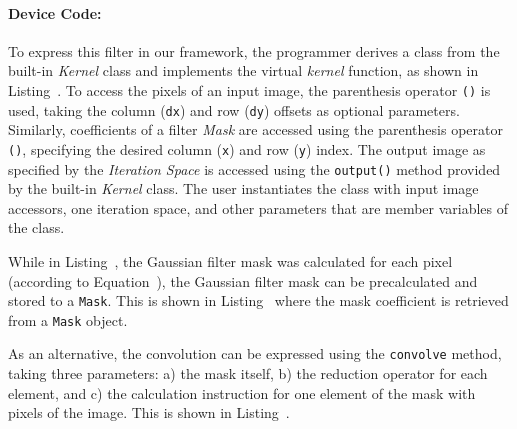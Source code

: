 \paragraph{Device Code:}
To express this filter in our framework, the programmer derives a class from the built-in {\em Kernel} class and implements the virtual {\em kernel} function, as shown in Listing~. To access the pixels of an input image, the parenthesis operator {\tt ()} is used, taking the column ({\tt dx}) and row ({\tt dy}) offsets as optional parameters. Similarly, coefficients of a filter {\em Mask} are accessed using the parenthesis operator {\tt ()}, specifying the desired column ({\tt x}) and row ({\tt y}) index. The output image as specified by the {\em Iteration Space} is accessed using the {\tt output()} method provided by the built-in {\em Kernel} class. The user instantiates the class with input image accessors, one iteration space, and other parameters that are member variables of the class.

While in Listing~, the Gaussian filter mask was calculated for each pixel (according to Equation~), the Gaussian filter mask can be precalculated and stored to a \verb|Mask|. This is shown in Listing~ where the mask coefficient is retrieved from a \verb|Mask| object.


As an alternative, the convolution can be expressed using the \verb|convolve| method, taking three parameters: a) the mask itself, b) the reduction operator for each element, and c) the calculation instruction for one element of the mask with pixels of the image. This is shown in Listing~.



